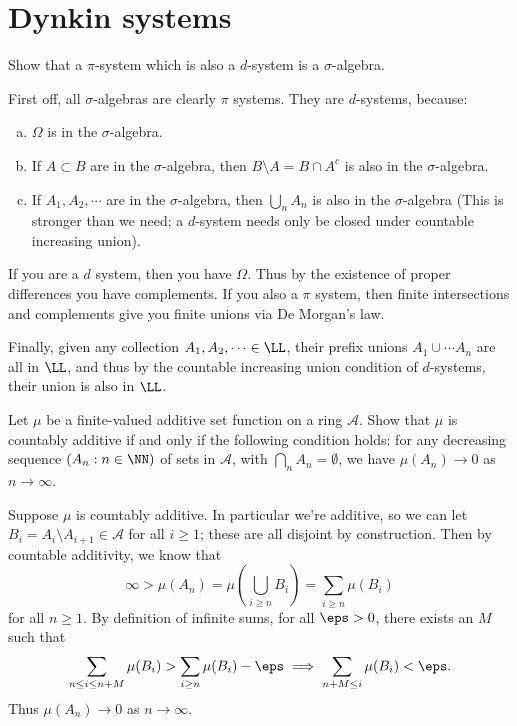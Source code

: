 \documentclass[11pt, headheight=30pt]{scrartcl}
\begin{document}
\section{Dynkin systems}

\begin{prob}
    Show that a $\pi$-system which is also a $d$-system is a $\sigma$-algebra.
\end{prob}

First off, all $\sigma$-algebras are clearly $\pi$ systems.
They are $d$-systems, because:
\begin{enumerate}[(a)]
    \item $\Omega$ is in the $\sigma$-algebra.
    \item If $A\subset B$ are in the $\sigma$-algebra, then
    $B\setminus A = B\cap A^c$ is also in the $\sigma$-algebra.
    \item If $A_1, A_2, \cdots$ are in the $\sigma$-algebra, then
    $\bigcup_n A_n$ is also in the $\sigma$-algebra
    (This is stronger than we need; a $d$-system needs only be closed under
    countable increasing union).
\end{enumerate}

If you are a $d$ system, then you have $\Omega$.
Thus by the existence of proper differences you have complements. If you
also a $\pi$ system, then finite intersections and complements give you
finite unions via De Morgan's law.

Finally, given any collection $A_1, A_2,\cdots \in \LL$,
their prefix unions $A_1\cup \cdots A_n$ are all in $\LL$, and thus by
the countable increasing union condition of $d$-systems,
their union is also in $\LL$.

\begin{prob}
    Let $\mu$ be a finite-valued additive set function on a ring $\mathcal{A}$.
    Show that $\mu$ is countably additive if and only if the following
    condition holds: for any decreasing sequence $(A_n : n \in \NN)$
    of sets in $\mathcal{A}$, with $\bigcap_n A_n = \emptyset$, we have
    $\mu(A_n) \to 0$ as $n \to \infty$.
\end{prob}

\begin{psec*}
    Suppose $\mu$ is countably additive. In particular we're additive,
    so we can let $B_i = A_{i}\setminus A_{i+1}\in \mathcal{A}$ for all $i\geq 1$;
    these are all disjoint by construction.
    Then by countable additivity, we know that
    \[
        \infty > \mu(A_n) = \mu\left(\bigcup_{i\geq n} B_i\right) = \sum_{i\geq n} \mu(B_i)  
    \]
    for all $n\geq 1$. By definition of infinite sums, for all
    $\eps > 0$, there exists an $M$ such that
    \[
        \sum_{n\leq i\leq n + M} \mu(B_i) > \sum_{i\geq n} \mu(B_i) - \eps \implies \sum_{n + M\leq i} \mu(B_i) < \eps.
    \]
    Thus $\mu(A_n) \to 0$ as $n\to \infty$.
\end{psec*}
\end{document}
